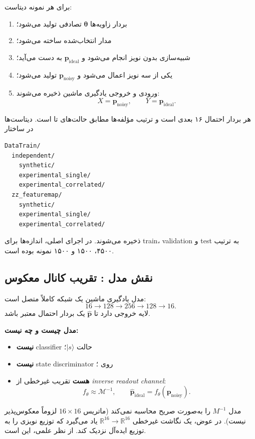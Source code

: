 برای هر نمونه دیتاست:
\begin{enumerate}
	\item بردار زاویه‌ها $\boldsymbol{\theta}$ تصادفی تولید می‌شود؛
	\item مدار انتخاب‌شده ساخته می‌شود؛
	\item شبیه‌سازی بدون نویز انجام می‌شود و $\mathbf{p}_{\mathrm{ideal}}$ به دست می‌آید؛
	\item یکی از سه نویز اعمال می‌شود و $\mathbf{p}_{\mathrm{noisy}}$ تولید می‌شود؛
	\item ورودی و خروجی یادگیری ماشین ذخیره می‌شوند:
	\[
		X=\mathbf{p}_{\mathrm{noisy}},\qquad
		Y=\mathbf{p}_{\mathrm{ideal}}.
	\]
\end{enumerate}
هر بردار احتمال ۱۶ بعدی است و ترتیب مؤلفه‌ها مطابق حالت‌های  تا  است. دیتاست‌ها در ساختار
\begin{latin}
\begin{verbatim}
DataTrain/
  independent/
    synthetic/
    experimental_single/
    experimental_correlated/
  zz_featuremap/
    synthetic/
    experimental_single/
    experimental_correlated/
\end{verbatim}
\end{latin}
ذخیره می‌شوند. در اجرای اصلی، اندازه‌ها برای train، validation و test به ترتیب ۴۵۰۰، ۱۵۰۰ و ۱۵۰۰ نمونه بوده است.

\subsection{نقش مدل : تقریب کانال معکوس}

مدل یادگیری ماشین یک شبکه کاملاً متصل است:
\[
	16 \rightarrow 128 \rightarrow 256 \rightarrow 128 \rightarrow 16.
\]
لایه خروجی  دارد تا $\hat{\mathbf{p}}$ یک بردار احتمال معتبر باشد.

\textbf{مدل  چیست و چه نیست:}
\begin{itemize}
	\item \textbf{نیست} classifier حالت $|s\rangle$؛
	\item \textbf{نیست} state discriminator روی ؛
	\item \textbf{هست} تقریب غیرخطی از \emph{inverse readout channel}:
	\[
		f_\theta \approx \mathcal{M}^{-1}, \qquad
		\hat{\mathbf{p}}_{\mathrm{ideal}} = f_\theta(\mathbf{p}_{\mathrm{noisy}}).
	\]
\end{itemize}

مدل $M^{-1}$ را به‌صورت صریح محاسبه نمی‌کند (ماتریس $16\times16$ لزوماً معکوس‌پذیر نیست). در عوض، یک نگاشت غیرخطی $\mathbb{R}^{16}\!\to\!\mathbb{R}^{16}$ یاد می‌گیرد که توزیع نویزی را به توزیع ایده‌آل نزدیک کند. از نظر علمی، این  است.

